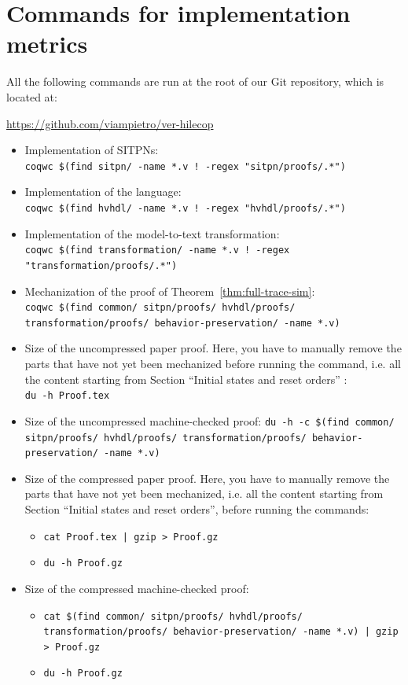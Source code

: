 \documentclass[pdflatex,sn-mathphys]{sn-jnl}%
\theoremstyle{thmstyleone}%
\theoremstyle{thmstyletwo}%
\theoremstyle{thmstylethree}%
\begin{document}
\section{Commands for implementation metrics}
\label{app:impl-metrics}

All the following commands are run at the root of our \textsf{Git}
repository, which is located at:

\begin{center}
  \url{https://github.com/viampietro/ver-hilecop}
\end{center}

\bigskip

\begin{itemize}
\item Implementation of SITPNs: \\
  \texttt{coqwc \$(find sitpn/ -name *.v ! -regex "sitpn/proofs/.*")}
\item Implementation of the \hvhdl{} language:\\
  \texttt{coqwc \$(find hvhdl/ -name *.v ! -regex "hvhdl/proofs/.*")}
\item Implementation of the \hilecop{} model-to-text transformation: \\
  \texttt{coqwc \$(find transformation/ -name *.v ! -regex "transformation/proofs/.*")}
\item Mechanization of the proof of Theorem~\ref{thm:full-trace-sim}: \\
  \texttt{coqwc \$(find common/ sitpn/proofs/ hvhdl/proofs/ transformation/proofs/ behavior-preservation/ -name *.v)}
\item Size of the uncompressed paper proof. Here, you have to manually remove the parts that have not yet been mechanized before running the command, i.e. all the content starting from Section ``Initial states and reset orders'' :\\
  \texttt{du -h Proof.tex}
\item Size of the uncompressed machine-checked proof:
  \texttt{du -h -c \$(find common/ sitpn/proofs/ hvhdl/proofs/ transformation/proofs/ behavior-preservation/ -name *.v)}
\item Size of the compressed paper proof. Here, you have to manually
  remove the parts that have not yet been mechanized, i.e. all the
  content starting from Section ``Initial states and reset orders'',
  before running the commands:
  \begin{itemize}
  \item \texttt{cat Proof.tex | gzip > Proof.gz}
  \item \texttt{du -h Proof.gz}
  \end{itemize}
\item Size of the compressed machine-checked proof:
  \begin{itemize}
  \item \texttt{cat \$(find common/ sitpn/proofs/ hvhdl/proofs/ transformation/proofs/ behavior-preservation/ -name *.v) | gzip > Proof.gz}
  \item \texttt{du -h Proof.gz}
  \end{itemize}
\end{itemize}


\end{document}
